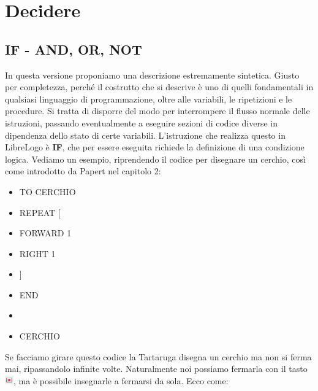 \chapter{Decidere} \label{cap:decidere}

\section{IF - AND, OR, NOT}

In questa versione proponiamo una descrizione estremamente sintetica. Giusto per completezza, perché il costrutto che si descrive è uno di quelli fondamentali in qualsiasi linguaggio di programmazione, oltre alle variabili, le ripetizioni e le procedure. Si tratta di disporre del modo per interrompere il flusso normale delle istruzioni, passando eventualmente a eseguire sezioni di codice diverse in dipendenza dello stato di certe variabili. L'istruzione che realizza questo in LibreLogo è \textbf{IF}, che per essere eseguita richiede la definizione di una condizione logica. Vediamo un esempio, riprendendo il codice per disegnare un cerchio, così come introdotto da Papert nel capitolo 2:

\vskip 1cm

\begin{scriptsize}
\begin{minipage}{0.50\textwidth}
\begin{itemize}[itemsep=-3pt,parsep=2pt, leftmargin=-0.0mm ]
\item[] TO CERCHIO                 
\item[] \hspace{8pt} 	REPEAT [ 
\item[] \hspace{8pt}\hspace{8pt}		FORWARD 1 
\item[] \hspace{8pt}\hspace{8pt}		RIGHT 1
\item[] \hspace{8pt}	]
\item[] END                            
\item[] 
\item[] CERCHIO                       
\end{itemize}
\end{minipage}
\end{scriptsize}

\vskip 1cm

Se facciamo girare questo codice la Tartaruga disegna un cerchio ma non si
ferma mai, ripassandolo infinite volte. Naturalmente noi possiamo fermarla con
il tasto \includegraphics[height=1em]{./images/ripetere/StopLO.png}, ma è possibile insegnarle a fermarsi da sola. Ecco come:


